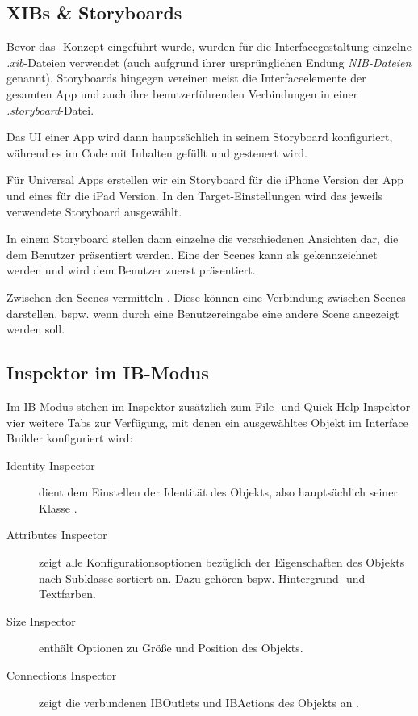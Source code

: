 \documentclass[parskip=half, final]{scrreprt}
\begin{document}
\subsection{XIBs \& Storyboards}

Bevor das -Konzept eingeführt wurde, wurden für die Interfacegestaltung einzelne \emph{.xib}-Dateien verwendet (auch aufgrund ihrer ursprünglichen Endung \emph{NIB-Dateien} genannt). Storyboards hingegen vereinen meist die Interfaceelemente der gesamten App und auch ihre benutzerführenden Verbindungen in einer \emph{.storyboard}-Datei.

Das UI einer App wird dann hauptsächlich in seinem Storyboard konfiguriert, während es im Code mit Inhalten gefüllt und gesteuert wird.

Für Universal Apps erstellen wir ein Storyboard für die iPhone Version der App und eines für die iPad Version. In den Target-Einstellungen  wird das jeweils verwendete Storyboard ausgewählt.

In einem Storyboard stellen dann einzelne  die verschiedenen Ansichten dar, die dem Benutzer präsentiert werden. Eine der Scenes kann als  gekennzeichnet werden und wird dem Benutzer zuerst präsentiert.

Zwischen den Scenes vermitteln . Diese können eine Verbindung zwischen Scenes darstellen, bspw. wenn durch eine Benutzereingabe eine andere Scene angezeigt werden soll.

\subsection{Inspektor im IB-Modus}\label{sec:ibinspector}

Im IB-Modus stehen im Inspektor zusätzlich zum File- und Quick-Help-Inspektor  vier weitere Tabs zur Verfügung, mit denen ein ausgewähltes Objekt im Interface Builder konfiguriert wird:
\begin{description}
\item[Identity Inspector] dient dem Einstellen der Identität des Objekts, also hauptsächlich seiner Klasse .
\item[Attributes Inspector] zeigt alle Konfigurationsoptionen bezüglich der Eigenschaften des Objekts nach Subklasse sortiert an. Dazu gehören bspw. Hintergrund- und Textfarben.
\item[Size Inspector] enthält Optionen zu Größe und Position des Objekts.
\item[Connections Inspector] zeigt die verbundenen IBOutlets und IBActions des Objekts an .
\end{description}
\end{document}
